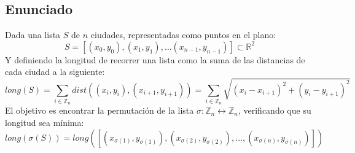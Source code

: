 \documentclass[a4paper, 11pt]{article} %
\begin{document}
  \subsection{Enunciado}
    Dada una lista $S$ de $n$ ciudades, representadas como puntos en el plano:
    \begin{equation}
      S = [(x_0,y_0), (x_1,y_1), \dots (x_{n-1},y_{n-1})] \subset \mathbb{R}^2
    \end{equation}
    Y definiendo la longitud de recorrer una lista como la suma de las distancias de cada ciudad a la siguiente:
    \begin{equation}
     long(S) = \sum_{i \in \mathbb{Z}_n} dist((x_i,y_i), (x_{i+1}, y_{i+1})) = \sum_{i \in \mathbb{Z}_n} \sqrt{(x_i-x_{i+1})^2 + (y_i-y_{i+1})^2}
    \end{equation}
    El objetivo es encontrar la permutación de la lista $\sigma : \mathbb{Z}_n \leftrightarrow \mathbb{Z}_n$, verificando que su longitud sea mínima:
    \begin{equation}
     long(\sigma(S)) = long([(x_{\sigma(1)},y_{\sigma(1)}), (x_{\sigma(2)},y_{\sigma(2)}), \dots, (x_{\sigma(n)},y_{\sigma(n)})])
    \end{equation}
    
\end{document}
